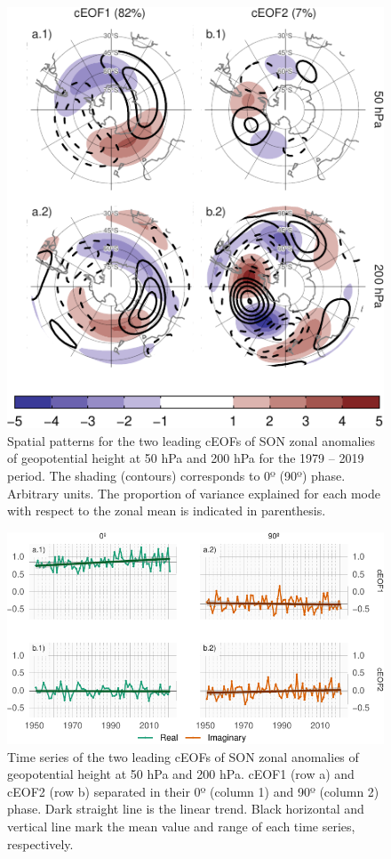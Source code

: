 \documentclass[pdflatex,sn-basic]{sn-jnl}
\theoremstyle{thmstyleone}%
\theoremstyle{thmstyletwo}%
\theoremstyle{thmstylethree}%
\begin{document}
\begin{figure}
\centering
\includegraphics{../figures/ceofs-1-1.pdf}
\caption{\label{fig:ceofs-1}Spatial patterns for the two leading cEOFs of SON zonal anomalies of geopotential height at 50 hPa and 200 hPa for the 1979 -- 2019 period. The shading (contours) corresponds to 0º (90º) phase. Arbitrary units. The proportion of variance explained for each mode with respect to the zonal mean is indicated in parenthesis.}
\end{figure}



\begin{figure}
\includegraphics{../figures/extended-series-1} \caption{Time series of the two leading cEOFs of SON zonal anomalies of geopotential height at 50 hPa and 200 hPa. cEOF1 (row a) and cEOF2 (row b) separated in their 0º (column 1) and 90º (column 2) phase. Dark straight line is the linear trend. Black horizontal and vertical line mark the mean value and range of each time series, respectively.}\label{fig:extended-series}
\end{figure}
\end{document}
